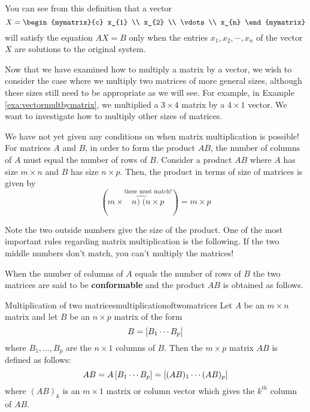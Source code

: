 You can see from this definition that a vector 
\begin{equation*}
X =
\begin{mymatrix}{c}
x_{1} \\
x_{2} \\
\vdots \\
x_{n}
\end{mymatrix}
\end{equation*}
will satisfy the equation $AX=B$
only when the entries $x_{1}, x_{2}, \cdots, x_{n}$ of the vector $X$ are solutions to the original system.

Now that we have examined how to multiply a matrix by a vector, we
wish to consider the case where we multiply two matrices of more
general sizes, although these sizes still need to be appropriate as we
will see. For example, in Example \ref{exa:vectormultbymatrix}, we
multiplied a $3 \times 4$ matrix by a $4 \times 1$ vector.  We want to
investigate how to multiply other sizes of matrices.

We have not yet given any conditions on when matrix multiplication is
possible!  For matrices $A$ and $B$, in order to form the product
$AB$, the number of columns of $A$ must equal the number of rows of
$B.$ Consider a product $AB$ where $A$ has size $m\times n$ and $B$
has size $n \times p$. Then, the product in terms of size of matrices
is given by
\begin{equation*}
(m\times\overset{\text{these must match!}}{\widehat{n)\;(n}\times p})=m\times p
\end{equation*}

Note the two outside numbers give the size of the product. One of the most important rules regarding matrix multiplication is the following. 
If the two middle numbers don't match, you can't multiply the
matrices!

When the number of columns of $A$ equals the number of rows
of $B$ the two matrices are said to be
\textbf{conformable} and the product
$AB$  is obtained as follows.

\begin{definition}{Multiplication of two matrices}{multiplicationoftwomatrices}
 Let $A$ be an $m\times n$ matrix
and let $B$ be an $n\times p$ matrix of the form
\begin{equation*}
B=\left[B_{1} \cdots  B_{p}\right]
\end{equation*}
where $B_{1},...,B_{p}$ are the $n\times 1$ columns of $B$. Then the 
$m\times p$ matrix $AB$ is defined as follows:
\begin{equation*}
AB = A \left[B_{1} \cdots  B_{p}\right] =  \left[(A B)_{1} \cdots  (AB)_{p}\right] 
\end{equation*}
where $(AB)_{k}$ is an $m\times 1$ matrix or column vector which
gives the $k^{th}$ column of $AB$. 
\end{definition}

